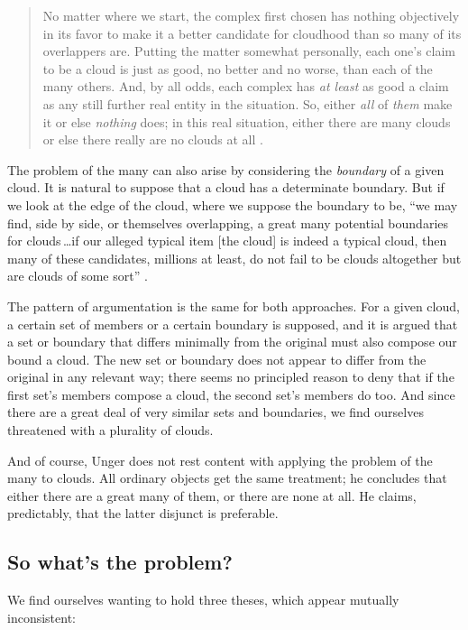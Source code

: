 \documentclass[11pt]{article}
\newenvironment{squote}{%
	\begin{quote}\begin{singlespace}%
	}{%
	\end{singlespace}\end{quote}}
\begin{document}
\begin{spacing}{1.5}
\begin{squote}
No matter where we start, the complex first chosen has nothing
objectively in its favor to make it a better candidate for cloudhood
than so many of its overlappers are.  Putting the matter somewhat
personally, each one's claim to be a cloud is just as good, no better
and no worse, than each of the many others.  And, by all odds, each
complex has \emph{at least} as good a claim as any still further real
entity in the situation.  So, either \emph{all} of \emph{them} make it
or else \emph{nothing} does; in this real situation, either there are
many clouds or else there really are no clouds at all
\citep[415]{unger1980a}.
\end{squote}

The problem of the many can also arise by considering the {\em
  boundary} of a given cloud.  It is natural to suppose that a cloud
has a determinate boundary.  But if we look at the edge of the cloud,
where we suppose the boundary to be, ``we may find, side by side, or
themselves overlapping, a great many potential boundaries for
clouds\,\ldots if our alleged typical item {[}the cloud{]} is indeed
a typical cloud, then many of these candidates, millions at least, do
not fail to be clouds altogether but are clouds of some
sort'' \citep[420--421]{unger1980a}.

The pattern of argumentation is the same for both approaches.  For a
given cloud, a certain set of members or a certain boundary is
supposed, and it is argued that a set or boundary that differs
minimally from the original must also compose our bound a cloud.  The
new set or boundary does not appear to differ from the original in any
relevant way; there seems no principled reason to deny that if the
first set's members compose a cloud, the second set's members do too.
And since there are a great deal of very similar sets and boundaries,
we find ourselves threatened with a plurality of clouds.

And of course, Unger does not rest content with applying the problem
of the many to clouds.  All ordinary objects get the same treatment;
he concludes that either there are a great many of them, or there are
none at all.  He claims, predictably, that the latter disjunct is
preferable.

\subsection{So what's the problem?}
We find ourselves wanting to hold three theses, which appear mutually
inconsistent:


\end{spacing}
\end{document}
